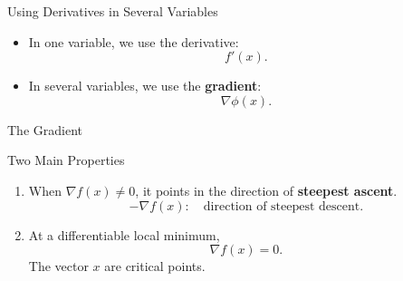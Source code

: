 \documentclass[10pt]{beamer}
\begin{document}

\begin{frame}{Using Derivatives in Several Variables}

\begin{itemize}
    \item In one variable, we use the derivative:
    \[
        f'(x).
    \]

    \vfill

    \item In several variables, we use the \textbf{gradient}:
    \[
        \nabla \phi(x).
    \]
\end{itemize}

\vfill



\end{frame}


\begin{frame}{The Gradient}

{}
    
\vspace{3mm}

\begin{block}{Two Main Properties}
\begin{enumerate}
    \item When $\nabla f(x)\ne 0$, it points in the direction
    of \textbf{steepest ascent}.
    \[
        -\nabla f(x): \quad \text{direction of steepest descent}.
    \]

    \item At a differentiable local minimum,
    \[
        \nabla f(x)=0.
    \]
    The vector $x$ are critical points.
\end{enumerate}
\end{block}

    
\end{frame}
\end{document}
